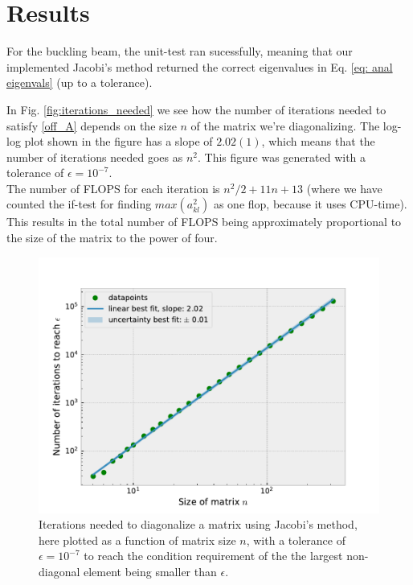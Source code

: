 \documentclass[%
 reprint,
nofootinbib,
aps,
]{revtex4-1}
\begin{document}
\section{Results}

For the buckling beam, the unit-test ran sucessfully, meaning that our implemented Jacobi's method returned the correct eigenvalues in Eq. \eqref{eq: anal eigenvals} (up to a tolerance).

In Fig. \vref{fig:iterations_needed} we see how the number of iterations needed to satisfy \eqref{off_A} depends on the size $n$ of the matrix we're diagonalizing. The log-log plot shown in the figure has a slope of $2.02(1)$, which means that the number of iterations needed goes as $n^2$. This figure was generated with a tolerance of $\epsilon=10^{-7}$.\\
The number of FLOPS for each iteration is $n^2/2 + 11n + 13$ (where we have counted the if-test for finding $max(a_{kl}^2)$ as one flop, because it uses CPU-time). This results in the total number of FLOPS being approximately proportional to the size of the matrix to the power of four.

\begin{figure}
\centering
\includegraphics[scale=0.5]{../figures/iterations_needed.pdf}
\caption{Iterations needed to diagonalize a matrix using Jacobi's method, here plotted as a function of matrix size $n$, with a tolerance of $\epsilon=10^{-7}$ to reach the condition requirement of the the largest non-diagonal element being smaller than $\epsilon$.}
\label{fig:iterations_needed}
\end{figure}
\end{document}
